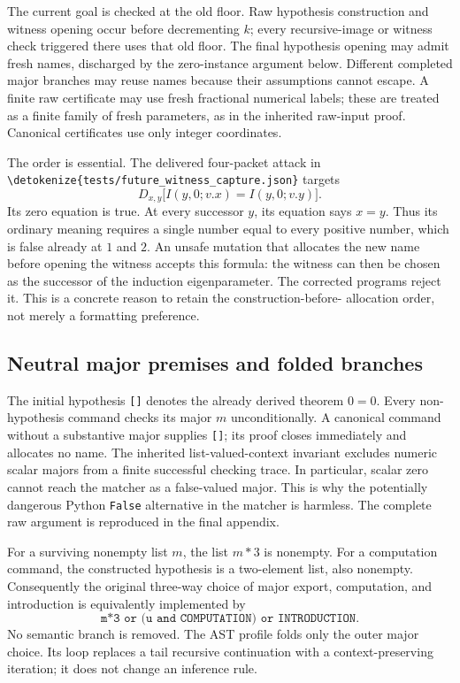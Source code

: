 \documentclass[11pt]{article}
\theoremstyle{definition}\newtheorem{definition}[theorem]{Definition}
\newcommand{\file}[1]{\expandafter\nolinkurl\expandafter{\detokenize{#1}}}
\begin{document}
The current goal is checked at the old floor. Raw hypothesis construction
and witness opening occur before decrementing $k$; every recursive-image
or witness check triggered there uses that old floor. The final hypothesis
opening may admit fresh names, discharged by the zero-instance argument
below. Different completed major
branches may reuse names because their assumptions cannot escape. A
finite raw certificate may use fresh fractional numerical labels; these
are treated as a finite family of fresh parameters, as in the inherited
raw-input proof. Canonical certificates use only integer coordinates.

The order is essential. The delivered four-packet attack in
\file{tests/future_witness_capture.json} targets
\[
 D_{x,y}\bigl[I(y,0;v.x)=I(y,0;v.y)\bigr].
\]
Its zero equation is true. At every successor $y$, its equation says
$x=y$. Thus its ordinary meaning requires a single number equal to
every positive number, which is false already at $1$ and $2$.
An unsafe mutation that allocates the new name before opening the
witness accepts this formula: the witness can then be chosen as the
successor of the induction eigenparameter. The corrected programs
reject it. This is a concrete reason to retain the construction-before-
allocation order, not merely a formatting preference.

\subsection{Neutral major premises and folded branches}
The initial hypothesis \texttt{[]} denotes the already derived theorem
$0=0$. Every non-hypothesis command checks its major $m$ unconditionally.
A canonical command without a substantive major supplies \texttt{[]};
its proof closes immediately and allocates no name. The inherited
list-valued-context invariant excludes numeric scalar majors from a
finite successful checking trace. In particular, scalar zero cannot
reach the matcher as a false-valued major. This is why the potentially
dangerous Python \texttt{False} alternative in the matcher is harmless.
The complete raw argument is reproduced in the final appendix.

For a surviving nonempty list $m$, the list $m*3$ is nonempty. For a
computation command, the constructed hypothesis is a two-element list,
also nonempty. Consequently the original three-way choice of major
export, computation, and introduction is equivalently implemented by
\[
 \texttt{m*3 or (u and COMPUTATION) or INTRODUCTION}.
\]
No semantic branch is removed. The AST profile folds only the outer
major choice. Its loop replaces a tail recursive continuation with a
context-preserving iteration; it does not change an inference rule.
\end{document}
